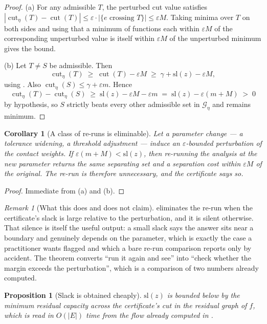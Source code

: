 \documentclass[11pt,a4paper]{article}
\newtheorem{corollary}[theorem]{Corollary}
\newtheorem{proposition}[theorem]{Proposition}
\theoremstyle{definition}
\theoremstyle{remark}
\newtheorem{remark}[theorem]{Remark}
\newcommand{\Gph}{\mathcal{G}}
\newcommand{\cut}{\operatorname{cut}}
\begin{document}
\begin{proof}
(a) For any admissible $T$, the perturbed cut value satisfies
$|\cut_\eta(T) - \cut(T)| \leq \varepsilon \cdot |\{e \text{ crossing }
T\}| \leq \varepsilon M$. Taking minima over $T$ on both sides and using
that a minimum of functions each within $\varepsilon M$ of the
corresponding unperturbed value is itself within $\varepsilon M$ of the
unperturbed minimum gives the bound.

(b) Let $T \neq S$ be admissible. Then
\[
\cut_\eta(T) \;\geq\; \cut(T) - \varepsilon M
\;\geq\; \gamma + \mathrm{sl}(z) - \varepsilon M ,
\]
using . Also
$\cut_\eta(S) \leq \gamma + \varepsilon m$. Hence
\[
\cut_\eta(T) - \cut_\eta(S)
\;\geq\; \mathrm{sl}(z) - \varepsilon M - \varepsilon m
\;=\; \mathrm{sl}(z) - \varepsilon(m+M) \;>\; 0
\]
by hypothesis, so $S$ strictly beats every other admissible set in
$\Gph_\eta$ and remains minimum.
\end{proof}

\begin{corollary}[A class of re-runs is eliminable]\label{cor:no-rerun}
Let a parameter change --- a tolerance widening, a threshold adjustment
--- induce an $\varepsilon$-bounded perturbation of the contact weights.
If $\varepsilon(m+M) < \mathrm{sl}(z)$, then re-running the analysis at
the new parameter returns the same separating set and a separation cost
within $\varepsilon M$ of the original. The re-run is therefore
unnecessary, and the certificate says so.
\end{corollary}

\begin{proof}
Immediate from (a) and (b).
\end{proof}

\begin{remark}[What this does and does not claim]\label{rem:rerun-scope}
 eliminates the re-run when the certificate's slack is
large relative to the perturbation, and it is silent otherwise. That
silence is itself the useful output: a small slack says the answer sits
near a boundary and genuinely depends on the parameter, which is exactly
the case a practitioner wants flagged and which a bare re-run comparison
reports only by accident. The theorem converts ``run it again and see''
into ``check whether the margin exceeds the perturbation'', which is a
comparison of two numbers already computed.
\end{remark}

\begin{proposition}[Slack is obtained cheaply]\label{prop:slack}
$\mathrm{sl}(z)$ is bounded below by the minimum residual capacity across
the certificate's cut in the residual graph of $f$, which is read in
$O(|E|)$ time from the flow already computed in
.
\end{proposition}
\end{document}
